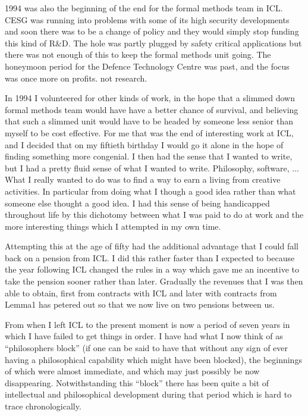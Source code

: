 \documentclass[10pt,titlepage]{book}
\begin{document}
1994 was also the beginning of the end for the formal methods team in ICL.
CESG was running into problems with some of its high security developments and soon there was to be a change of policy and they would simply stop funding this kind of R\&D.
The hole was partly plugged by safety critical applications but there was not enough of this to keep the formal methods unit going.
The honeymoon period for the Defence Technology Centre was past, and the focus was once more on profits. not research.

In 1994 I volunteered for other kinds of work, in the hope that a slimmed down formal methods team would have have a better chance of survival, and believing that such a slimmed unit would have to be headed by someone less senior than myself to be cost effective.
For me that was the end of interesting work at ICL, and I decided that on my fiftieth birthday I would go it alone in the hope of finding something more congenial.
I then had the sense that I wanted to write, but I had a pretty fluid sense of what I wanted to write.
Philosophy, software, ...
What I really wanted to do was to find a way to earn a living from creative activities.
In particular from doing what I though a good idea rather than what someone else thought a good idea.
I had this sense of being handicapped throughout life by this dichotomy between what I was paid to do at work and the more interesting things which I attempted in my own time.

Attempting this at the age of fifty had the additional advantage that I could fall back on a pension from ICL.
I did this rather faster than I expected to because the year following ICL changed the rules in a way which gave me an incentive to take the pension sooner rather than later.
Gradually the revenues that I was then able to obtain, first from contracts with ICL and later with contracts from Lemma1 has petered out so that we now live on two pensions between us.

From when I left ICL to the present moment is now a period of seven years in which I have failed to get things in order.
I have had what I now think of as ``philosophers block'' (if one can be said to have that without any sign of ever having a philosophical capability which might have been blocked), the beginnings of which were almost immediate, and which may just possibly be now disappearing.
Notwithstanding this ``block'' there has been quite a bit of intellectual and philosophical development during that period which is hard to trace chronologically.
\end{document}
